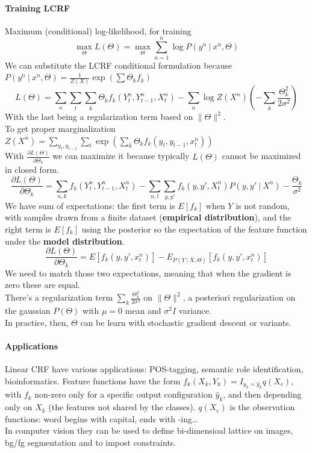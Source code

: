 \documentclass[10pt]{report}
\begin{document}
\paragraph{Training LCRF}Maximum (conditional) log-likelihood, for training $$\max_\Theta L(\Theta) = \max_\Theta\sum_{n=1}^n\log P(y^n\:|\:x^n,\Theta)$$
We can substitute the LCRF conditional formulation because $P(y^n\:|\:x^n,\Theta) = \frac{1}{Z(X)}\exp(\sum \Theta_k f_k)$
$$L(\Theta)=\sum_n\sum_t\sum_k \Theta_kf_k(Y_t^n,Y_{t-1}^n,X_t^n)-\sum_n\log Z(X^n)\left(-\sum_k\frac{\Theta_k^2}{2\sigma^2}\right)$$
With the last being a regularization term based on $\|\Theta\|^2$.\\
To get proper marginalization $Z(X^n) = \sum_{y_t,y_{t-1}}\sum_t \exp(\sum_k\Theta_k f_k(y_t,y_{t-1},x^n_t))$\\
With $\frac{\partial L(\Theta)}{\partial \Theta_k}$ we can maximize it because typically $L(\Theta)$ cannot be maximized in closed form.
$$\frac{\partial L(\Theta)}{\partial \Theta_k} = \sum_{n,k}f_k(Y_t^n,Y_{t-1}^n,X_t^n)-\sum_{n,t}\sum_{y,y'}f_k(y,y',X_t^n)P(y,y'\:|\:X^n)-\frac{\Theta_k}{\sigma^2}$$ 
We have sum of expectations: the first term is $E[f_k]$ when $Y$ is not random, with samples drawn from a finite dataset (\textbf{empirical distribution}), and the right term is $E[f_k]$ using the posterior so the expectation of the feature function under the \textbf{model distribution}. $$\frac{\partial L(\Theta)}{\partial \Theta_k} = E[f_k(y,y',x^n_t)] - E_{P(Y\:|\:X,\Theta)}[f_k(y,y',x_t^n)]$$
We need to match those two expectations, meaning that when the gradient is zero these are equal.\\
There's a regularization term $\sum_k\frac{\Theta_k^2}{2\sigma^2}$ on $\|\Theta\|^2$, a posteriori regularization on the gaussian $P(\Theta)$ with $\mu=0$ mean and $\sigma^2I$ variance.\\
In practice, then, $\Theta$ can be learn with stochastic gradient descent or variants.
\paragraph{Applications} Linear CRF have various applications: POS-tagging, semantic role identification, bioinformatics. Feature functions have the form $f_k(X_k,Y_k)=I_{y_k=\hat{y}_k}q(X_c)$, with $f_k$ non-zero only for a specific output configuration $\hat{y}_k$, and then depending only on $X_k$ (the features not shared by the classes). $q(X_c)$ is the observation functions: word begins with capital, ends with -ing\ldots\\
In computer vision they can be used to define bi-dimensioal lattice on images, bg/fg segmentation and to impost constraints.
\end{document}
